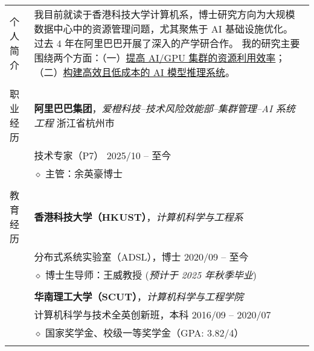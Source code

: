 \documentclass[letterpaper, 10pt]{article}
\begin{document}
\begin{longtable}{p{0.7in}p{6.0in}}

{个人简介}
&
    我目前就读于香港科技大学计算机系，博士研究方向为大规模数据中心中的资源管理问题，尤其聚焦于 AI 基础设施优化。
    过去 4 年在阿里巴巴开展了深入的产学研合作。
    我的研究主要围绕两个方面：（一）\underline{提高 AI/GPU 集群的资源利用效率}；（二）\underline{构建高效且低成本的 AI 模型推理系统}。
    \\
& \\

{职业经历}
& \textbf{阿里巴巴集团}，\textit{爱橙科技--技术风险效能部--集群管理--AI 系统工程} \hfill 浙江省杭州市 \\
& 技术专家（P7） \hfill 2025/10 -- 至今 \\
& $\diamond$ 主管：余英豪博士 \\
& \\

{教育经历}
& \textbf{香港科技大学（HKUST）}，\textit{计算机科学与工程系} \\
& 分布式系统实验室（ADSL），博士 \hfill 2020/09 -- 至今 \\
& $\diamond$ 博士生导师：王威教授 \hfill (\textit{预计于 2025 年秋季毕业}) \\
& \\

& \textbf{华南理工大学（SCUT）}，\textit{计算机科学与工程学院} \\
& 计算机科学与技术全英创新班，本科 \hfill 2016/09 -- 2020/07 \\
& $\diamond$ 国家奖学金、校级一等奖学金（GPA: 3.82/4） \\
& \\


\end{longtable}
\end{document}
